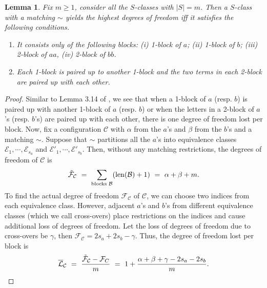 \documentclass[11pt,reqno]{amsart}
\numberwithin{equation}{section}
\theoremstyle{plain}
\newtheorem{lemma}[thm]{Lemma}
\begin{document}
\begin{lemma}\label{blockslemma}
Fix $m\geq 1$, consider all the $S$-classes with $|S|=m$. Then a $S$-class with a matching $\sim$ yields the highest degrees of freedom iff it satisfies the following conditions.
\begin{enumerate}
\item It consists only of the following blocks: (i) 1-block of $a$; (ii) 1-block of $b$; (iii) 2-block of $aa$, (iv) 2-block of $bb$.
\item Each 1-block is paired up to another 1-block and the two terms in each 2-block are paired up with each other.
\end{enumerate}
\end{lemma}

\begin{proof}
Similar to Lemma 3.14 of \cite{split}, we see that when a 1-block of $a$ (resp. $b$) is paired up with another 1-block of $a$ (resp. $b$) or when the letters in a 2-block of $a$'s (resp. $b$'s) are paired up with each other, there is one degree of freedom lost per block. Now, fix a configuration $\mathcal{C}$ with $\alpha$ from the $a$'s and $\beta$ from the $b$'s and a matching $\sim$. Suppose that $\sim$ partitions all the $a$'s into equivalence classes $\mathcal{E}_1, \cdots, \mathcal{E}_{s_a}$ and $\mathcal{E}'_1, \cdots, \mathcal{E}'_{s_b}$. Then, without any matching restrictions, the degrees of freedom of $\mathcal{C}$ is
\begin{align}
\mathcal{\Tilde{F}}_{\mathcal{C}} \ = \ \sum_{\textup{blocks } \mathcal{B}}(\textup{len}(\mathcal{B})+1) \ = \ \alpha+\beta+m.
\end{align}
To find the actual degree of freedom $\mathcal{F}_\mathcal{C}$ of $\mathcal{C}$, we can choose two indices from each equivalence class. However, adjacent $a$'s and $b$'s from different equivalence classes (which we call cross-overs) place restrictions on the indices and cause additional loss of degrees of freedom. Let the loss of degrees of freedom due to cross-overs be $\gamma$, then $\mathcal{F}_\mathcal{C}=2s_a+2s_b-\gamma$. Thus, the degree of freedom lost per block is
\begin{equation}\label{degreeoffreedom}
\mathcal{\overline{L}}_\mathcal{C} \ = \ \frac{\mathcal{\Tilde{F}_C}-\mathcal{F}_C}{m} \ = \ 1+\frac{\alpha+\beta+\gamma-2s_a-2s_b}{m}.
\end{equation}

\end{proof}
\end{document}
